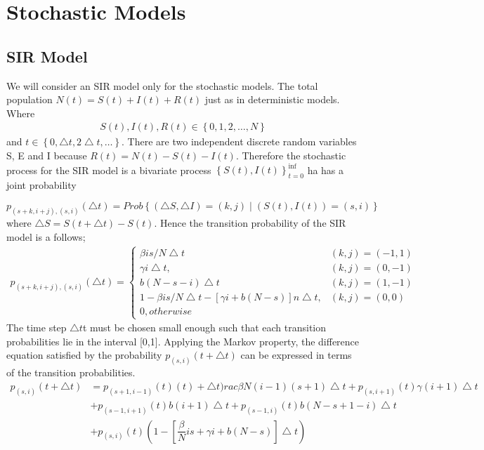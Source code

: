 \section{Stochastic Models}
\subsection{SIR Model}
We will consider an SIR model only for the stochastic models. The total population $N(t) = S(t)  + I(t) + R(t)$ just as in deterministic models. Where 
\begin{align}
S(t), I(t), R(t) \in \left\lbrace 0,1,2,\dots , N \right\rbrace 
\end{align}
and $t \in \left\lbrace 0,\bigtriangleup t ,2 \bigtriangleup t, \dots \right\rbrace$. There are two independent discrete random variables  S, E and I because $R(t) = N(t) -S(t) -I(t)$. Therefore the stochastic process for the SIR model is a bivariate process $\left\lbrace S(t), I(t) \right \rbrace^{\inf}_{t =0}$ ha has a joint probability 

\begin{equation}
p_{(s+k,i+j),(s,i)}(\bigtriangleup t )= Prob \left\lbrace( \bigtriangleup S ,\bigtriangleup I) = (k,j)\mid (S(t), I(t)) = (s,i) \right\rbrace
\end{equation}
where $\bigtriangleup S = S(t + \bigtriangleup t) - S(t)$. Hence the transition probability of the SIR model is a follows;
\begin{align}
p_{(s+k,i+j),(s,i)}(\bigtriangleup t )= \left\lbrace \begin{array}{ll}
 \beta i s / N \bigtriangleup t & (k,j) = (-1,1)
 \\ \gamma i \bigtriangleup t, & (k,j) = (0,-1)
 \\ b (N- s -i)\bigtriangleup t & (k,j) = (1,-1)
 \\ 1 - \beta i s/N \bigtriangleup t - \left[\gamma i +b(N-s) \right]n\bigtriangleup t ,& (k,j) =(0,0)
 \\ 0, otherwise
 \end{array} \right.
\end{align}
The time step $\bigtriangleup t$t must be chosen small enough such that each transition probabilities lie in the interval [0,1]. Applying the Markov property, the difference equation satisfied by the probability $p_{(s,i)} (t +\bigtriangleup t)$ can be expressed in terms of the transition probabilities.
\begin{align*}
p_{(s,i)} (t + \bigtriangleup t) &= p_{(s+1, i-1)}(t) (t) +\bigtriangleup t)rac{\beta}{N}(i -1)(s +1) \bigtriangleup t + p _{(s,i+1)} (t) \gamma (i +1) \bigtriangleup t \\ &+ p_{(s-1,i+1)}(t) b(i+1) \bigtriangleup t + p_{(s-1,i)}(t)b(N-s+1- i) \bigtriangleup t  \\&
+  {p_(s,i)}(t) \left(1 - \left[\dfrac{\beta}{N} is + \gamma i + b(N-s) \right] \bigtriangleup t\right)
\end{align*}

